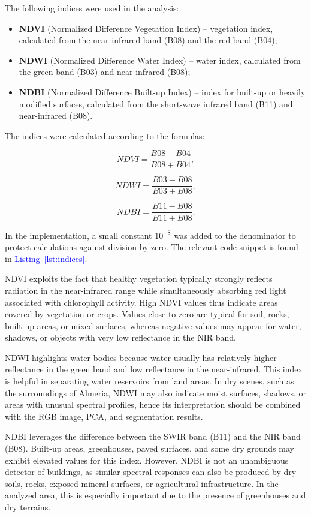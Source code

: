 \documentclass[12pt,a4paper]{article}
\newcommand{\kodref}[2]{\hyperref[#1]{\textcolor{blue}{#2}}}
\begin{document}
    The following indices were used in the analysis:
    \begin{itemize}
       \item \textbf{NDVI} (Normalized Difference Vegetation Index) -- vegetation index, calculated from the near-infrared band (B08) and the red band (B04);
       \item \textbf{NDWI} (Normalized Difference Water Index) -- water index, calculated from the green band (B03) and near-infrared (B08);
       \item \textbf{NDBI} (Normalized Difference Built-up Index) -- index for built-up or heavily modified surfaces, calculated from the short-wave infrared band (B11) and near-infrared (B08).
    \end{itemize}

    The indices were calculated according to the formulas:

    \[
    NDVI = \frac{B08 - B04}{B08 + B04},
    \]

    \[
    NDWI = \frac{B03 - B08}{B03 + B08},
    \]

    \[
    NDBI = \frac{B11 - B08}{B11 + B08}.
    \]

    In the implementation, a small constant $10^{-8}$ was added to the denominator to protect calculations against division by zero. The relevant code snippet is found in \kodref{lst:indices}{Listing~\ref*{lst:indices}}.

    NDVI exploits the fact that healthy vegetation typically strongly reflects radiation in the near-infrared range while simultaneously absorbing red light associated with chlorophyll activity. High NDVI values thus indicate areas covered by vegetation or crops. Values close to zero are typical for soil, rocks, built-up areas, or mixed surfaces, whereas negative values may appear for water, shadows, or objects with very low reflectance in the NIR band.

    NDWI highlights water bodies because water usually has relatively higher reflectance in the green band and low reflectance in the near-infrared. This index is helpful in separating water reservoirs from land areas. In dry scenes, such as the surroundings of Almeria, NDWI may also indicate moist surfaces, shadows, or areas with unusual spectral profiles, hence its interpretation should be combined with the RGB image, PCA, and segmentation results.

    NDBI leverages the difference between the SWIR band (B11) and the NIR band (B08). Built-up areas, greenhouses, paved surfaces, and some dry grounds may exhibit elevated values for this index. However, NDBI is not an unambiguous detector of buildings, as similar spectral responses can also be produced by dry soils, rocks, exposed mineral surfaces, or agricultural infrastructure. In the analyzed area, this is especially important due to the presence of greenhouses and dry terrains.
\end{document}

